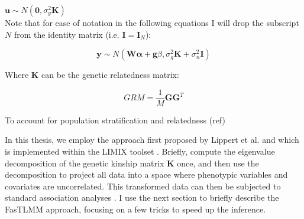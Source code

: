 $\mathbf{u} \sim N(\mathbf{0}, \sigma_g^2\mathbf{K})$\\


Note that for ease of notation in the following equations I will drop the subscript $N$ from the identity matrix (i.e. $\mathbf{I} = \mathbf{I}_N$):

\begin{equation}\label{eq34}
 \mathbf{y} \sim  N(\mathbf{W}\boldsymbol{\alpha} + \mathbf{g}\beta, \sigma_g^2\mathbf{K} + \sigma_n^2\mathbf{I})
\end{equation}

Where $\mathbf{K}$ can be the genetic relatedness matrix:

\begin{equation}
    GRM = \frac{1}{M}\mathbf{G}\mathbf{G}^T
\end{equation}




To account for population stratification and relatedness (ref)







In this thesis, we employ the approach first proposed by Lippert et al. \cite{lippert2011fast} and which is implemented within the LIMIX toolset \cite{lippert2014limix,casale2015efficient}. 
Briefly, \cite{lippert2014limix} compute the eigenvalue decomposition of the genetic kinship matrix $\mathbf{K}$ once, and then use the decomposition to project all data into a space where phenotypic variables and covariates are uncorrelated. 
This transformed data can then be subjected to standard association analyses \cite{lippert2014limix}.
I use the next section to briefly describe the FasTLMM approach, focusing on a few tricks to speed up the inference.


